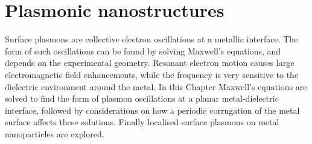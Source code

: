 
\chapter{Plasmonic nanostructures}

\graphicspath{{Chapter3/Figures/}}

Surface plasmons are collective electron oscillations at a metallic interface. The form of such oscillations can be found by solving Maxwell's equations, and depends on the experimental geometry. Resonant electron motion causes large electromagnetic field enhancements, while the frequency is very sensitive to the dielectric environment around the metal. In this Chapter Maxwell's equations are solved to find the form of plasmon oscillations at a planar metal-dielectric interface, followed by considerations on how a periodic corrugation of the metal surface affects these solutions. Finally localised surface plasmons on	metal nanoparticles are explored.

